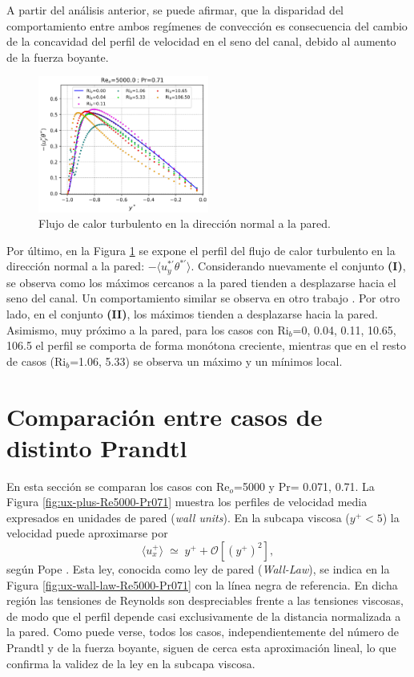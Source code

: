 A partir del análisis anterior, se puede afirmar, que la disparidad del comportamiento  entre ambos regímenes de convección es consecuencia del cambio de la concavidad del perfil de velocidad en el seno del canal, debido al aumento de la fuerza boyante.


\begin{figure}[H] %
  \centering
  \includegraphics[width=0.5\textwidth]{figures/cap5/Re5000-Pr071/uyphif_profile.png}  
  \caption{Flujo de calor turbulento en la dirección normal a la pared.}
  \label{fig:uyphi_f-Re5000-Pr071}
\end{figure}

Por último, en la Figura \ref{fig:uyphi_f-Re5000-Pr071} se expone el perfil del flujo de calor turbulento en la dirección normal a la pared: $-\langle u_y^{\ast \prime } \theta^{\ast \prime } \rangle$. Considerando nuevamente el conjunto \textbf{(I)}, se observa como los máximos cercanos a la pared tienden a desplazarse hacia el seno del canal. Un comportamiento similar se observa en otro trabajo \cite{you2003direct}. Por otro lado, en el conjunto \textbf{(II)}, los máximos tienden a desplazarse hacia la pared. Asimismo, muy próximo a la pared, para los casos con Ri$_b$=0, 0.04, 0.11, 10.65, 106.5 el perfil se comporta de forma monótona creciente, mientras que en el resto de casos (Ri$_b$=1.06, 5.33) se observa un máximo y un mínimos local. 



\section{Comparación entre casos de distinto Prandtl}

En esta sección se comparan los casos con Re$_o$=5000 y Pr= 0.071, 0.71. La Figura \ref{fig:ux-plus-Re5000-Pr071} muestra los perfiles de velocidad media expresados en unidades de pared (\textit{wall units}). En la subcapa viscosa ($y^+ < 5$) la velocidad puede aproximarse por
$$\langle u_x^+ \rangle \;\simeq\; y^+ + \mathcal{O} \left[(y^+)^{2} \right],$$
según Pope \cite{pope2001turbulent}. Esta ley, conocida como ley de pared (\textit{Wall-Law}), se indica en la Figura \ref{fig:ux-wall-law-Re5000-Pr071} con la línea negra de referencia. En dicha región las tensiones de Reynolds son despreciables frente a las tensiones viscosas, de modo que el perfil depende casi exclusivamente de la distancia normalizada a la pared. Como puede verse, todos los casos, independientemente del número de Prandtl y de la fuerza boyante, siguen de cerca esta aproximación lineal, lo que confirma la validez de la ley en la subcapa viscosa. 

